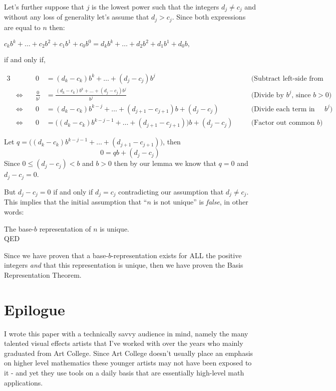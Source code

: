 \documentclass{article}
\begin{document}
Let's further suppose that $j$ is the lowest power such that the integers $d_j\ne{}c_j$ and without any loss of generality
let's assume that $d_j>c_j$. Since both expressions are equal to $n$ then:
\begin{center}
$c_kb^k+\dots+c_2b^2+c_1b^1+c_0b^0=d_kb^k+\dots+d_2b^2+d_1b^1+d_0b,$

\smallskip
if and only if,
\end{center}
{\small
\begin{alignat*}{3}
  &&0
  &= (d_k-c_k)b^k+\dots+(d_j-c_j)b^j&&\quad\text{(Subtract left-side from both-sides)}\\
  &\Leftrightarrow\quad
  &\frac{0}{b^j}
  &= \frac{(d_k-c_k)b^k+\dots+(d_j-c_j)b^j}{b^j} &&\quad\text{(Divide by }b^j\text{, since }b>0\text{)}\\
  &\Leftrightarrow\quad
  &0
  &=(d_k-c_k)b^{k-j}+\dots+(d_{j+1}-c_{j+1})b+(d_j-c_j) &&\quad\text{(Divide each term in numerator by }b^j{)}\\
  &\Leftrightarrow\quad
  &0
  &= \big((d_k-c_k)b^{k-j-1}+\dots+(d_{j+1}-c_{j+1})\big)b+(d_j-c_j) &&\quad\text{(Factor out common }b{)}
\end{alignat*}
}

Let $q=\big((d_k-c_k)b^{k-j-1}+\dots+(d_{j+1}-c_{j+1})\big)$, then
\[0=qb+(d_j-c_j)\]
Since $0\le(d_j-c_j)<b$ and $b>0$ then by our lemma we know that
$q=0$ and $d_j-c_j = 0$.

But $d_j-c_j = 0$ if and only if $d_j = c_j$
contradicting our assumption that $d_j\ne{}c_j$. This implies that the initial assumption that ``$n$
is not unique'' is \emph{false}, in other words:
\begin{center}
The base-$b$ representation of $n$ is unique.\\
QED
\end{center}

\bigskip
Since we have proven that a base-$b$-representation exists for ALL the positive integers \emph{and}
that this representation is unique, then we
have proven the Basis Representation Theorem.

\break
\section*{Epilogue}

I wrote this paper with a technically savvy audience in mind, namely the many talented visual effects artists
that I've worked with over the years who mainly graduated from Art College. Since Art College doesn't
usually place an emphasis on higher level mathematics these younger artists may not have been exposed to
it - and yet they use tools on a daily basis that are essentially high-level math applications.
\end{document}
